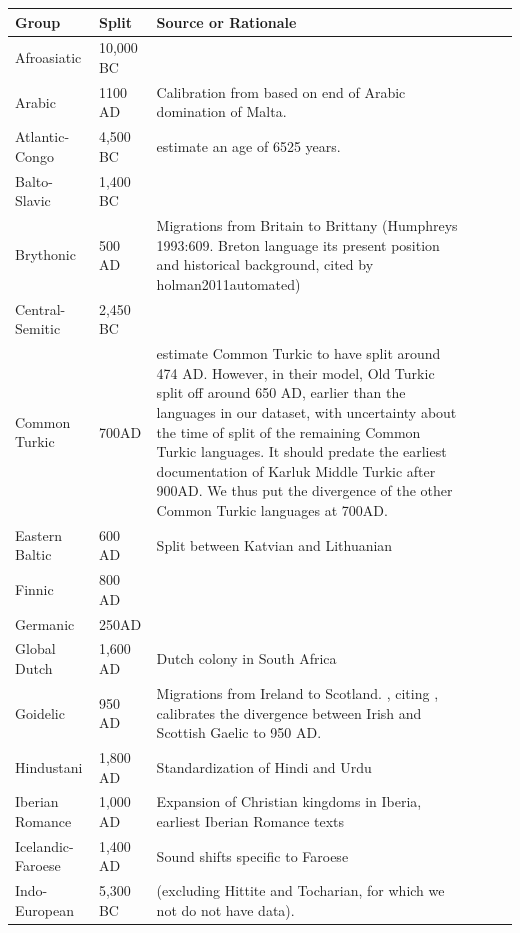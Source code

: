 \documentclass[11pt,a4paper]{article}
\begin{document}
\begin{longtable}{llp{10cm}lll}
Group & Split & Source or Rationale \\ \hline
Afroasiatic & 10,000 BC & \cite{diakonoff1998the} \\
Arabic & 1100 AD & Calibration from \citep{holman2011automated} based on end of Arabic domination of Malta. \\
Atlantic-Congo & 4,500 BC & \citet{holman2011automated} estimate an age of 6525 years.\\
Balto-Slavic & 1,400 BC & \citep{gray2003language} \\
Brythonic & 500 AD & Migrations from Britain to Brittany (Humphreys 1993:609. Breton language its present position and historical background, cited by holman2011automated)\\
Central-Semitic & 2,450 BC & \citep{kitchen2009bayesian}   \\
Common Turkic & 700AD & \cite[p. 49]{savelyev2020bayesian} estimate Common Turkic to have split around 474 AD. However, in their model, Old Turkic split off around 650 AD, earlier than the languages in our dataset, with uncertainty about the time of split of the remaining Common Turkic languages. It should predate the earliest documentation of Karluk Middle Turkic after 900AD. We thus put the divergence of the other Common Turkic languages at 700AD. \\
Eastern Baltic & 600 AD & Split between Katvian and Lithuanian \citep[p. 209]{novotna2011glottochronology}\\
Finnic & 800 AD & \cite[Section 4.1]{maurits2020best} \\
Germanic & 250AD & \cite{gray2003language} \\
Global Dutch & 1,600 AD & Dutch colony in South Africa \\
Goidelic & 950 AD & Migrations from Ireland to Scotland. \citet{holman2011automated}, citing \citet{jackson1951gaelic}, calibrates the divergence between Irish and Scottish Gaelic to 950 AD. \\
Hindustani & 1,800 AD & Standardization of Hindi and Urdu\\
Iberian Romance & 1,000 AD & Expansion of Christian kingdoms in Iberia, earliest Iberian Romance texts \\
Icelandic-Faroese & 1,400 AD & Sound shifts specific to Faroese\\
Indo-European & 5,300 BC & \citep{gray2003language} (excluding Hittite and Tocharian, for which we not do not have data). \\

\end{longtable}
\end{document}
